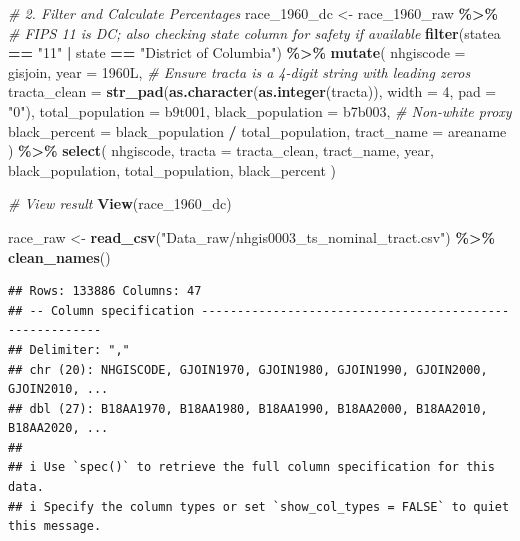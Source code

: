 \documentclass[
]{article}
\newenvironment{Shaded}{\begin{snugshade}}{\end{snugshade}}
\newcommand{\AttributeTok}[1]{\textcolor[rgb]{0.13,0.29,0.53}{#1}}
\newcommand{\CommentTok}[1]{\textcolor[rgb]{0.56,0.35,0.01}{\textit{#1}}}
\newcommand{\DataTypeTok}[1]{\textcolor[rgb]{0.13,0.29,0.53}{#1}}
\newcommand{\DecValTok}[1]{\textcolor[rgb]{0.00,0.00,0.81}{#1}}
\newcommand{\FunctionTok}[1]{\textcolor[rgb]{0.13,0.29,0.53}{\textbf{#1}}}
\newcommand{\NormalTok}[1]{#1}
\newcommand{\OtherTok}[1]{\textcolor[rgb]{0.56,0.35,0.01}{#1}}
\newcommand{\SpecialCharTok}[1]{\textcolor[rgb]{0.81,0.36,0.00}{\textbf{#1}}}
\newcommand{\StringTok}[1]{\textcolor[rgb]{0.31,0.60,0.02}{#1}}
\begin{document}
\begin{Shaded}
\begin{Highlighting}[]
\CommentTok{\# 2. Filter and Calculate Percentages}
\NormalTok{race\_1960\_dc }\OtherTok{\textless{}{-}}\NormalTok{ race\_1960\_raw }\SpecialCharTok{\%\textgreater{}\%}
  \CommentTok{\# FIPS 11 is DC; also checking \textquotesingle{}state\textquotesingle{} column for safety if available}
  \FunctionTok{filter}\NormalTok{(statea }\SpecialCharTok{==} \StringTok{"11"} \SpecialCharTok{|}\NormalTok{ state }\SpecialCharTok{==} \StringTok{"District of Columbia"}\NormalTok{) }\SpecialCharTok{\%\textgreater{}\%} 
  \FunctionTok{mutate}\NormalTok{(}
    \AttributeTok{nhgiscode =}\NormalTok{ gisjoin,}
    \AttributeTok{year =} \DecValTok{1960}\DataTypeTok{L}\NormalTok{,}
    \CommentTok{\# Ensure tracta is a 4{-}digit string with leading zeros}
    \AttributeTok{tracta\_clean =} \FunctionTok{str\_pad}\NormalTok{(}\FunctionTok{as.character}\NormalTok{(}\FunctionTok{as.integer}\NormalTok{(tracta)), }\AttributeTok{width =} \DecValTok{4}\NormalTok{, }\AttributeTok{pad =} \StringTok{"0"}\NormalTok{),}
    \AttributeTok{total\_population =}\NormalTok{ b9t001,}
    \AttributeTok{black\_population =}\NormalTok{ b7b003, }\CommentTok{\# Non{-}white proxy}
    \AttributeTok{black\_percent =}\NormalTok{ black\_population }\SpecialCharTok{/}\NormalTok{ total\_population,}
    \AttributeTok{tract\_name =}\NormalTok{ areaname}
\NormalTok{  ) }\SpecialCharTok{\%\textgreater{}\%}
  \FunctionTok{select}\NormalTok{(}
\NormalTok{    nhgiscode, }
    \AttributeTok{tracta =}\NormalTok{ tracta\_clean, }
\NormalTok{    tract\_name, }
\NormalTok{    year, }
\NormalTok{    black\_population,}
\NormalTok{    total\_population, }
\NormalTok{    black\_percent}
\NormalTok{  )}

\CommentTok{\# View result}
\FunctionTok{View}\NormalTok{(race\_1960\_dc)}
\end{Highlighting}
\end{Shaded}

\begin{Shaded}
\begin{Highlighting}[]
\NormalTok{race\_raw }\OtherTok{\textless{}{-}} \FunctionTok{read\_csv}\NormalTok{(}\StringTok{"Data\_raw/nhgis0003\_ts\_nominal\_tract.csv"}\NormalTok{) }\SpecialCharTok{\%\textgreater{}\%}
  \FunctionTok{clean\_names}\NormalTok{()}
\end{Highlighting}
\end{Shaded}

\begin{verbatim}
## Rows: 133886 Columns: 47
## -- Column specification --------------------------------------------------------
## Delimiter: ","
## chr (20): NHGISCODE, GJOIN1970, GJOIN1980, GJOIN1990, GJOIN2000, GJOIN2010, ...
## dbl (27): B18AA1970, B18AA1980, B18AA1990, B18AA2000, B18AA2010, B18AA2020, ...
## 
## i Use `spec()` to retrieve the full column specification for this data.
## i Specify the column types or set `show_col_types = FALSE` to quiet this message.
\end{verbatim}
\end{document}
